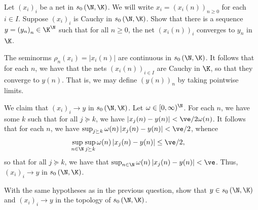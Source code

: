 \documentclass[10pt]{mypackage}
\begin{document}
\begin{problem}[Problem II.8]
  Let $\left( x_i \right)_i$ be a net in $s_0\left( \N,\K \right)$. We will write $x_i = \left( x_{i}(n) \right)_{n\geq 0}$ for each $i\in I$. Suppose $\left( x_i \right)_i$ is Cauchy in $s_0\left( \N,\K \right)$. Show that there is a sequence $y = \left( y_n \right)_n\in \K^{\N}$ such that for all $n\geq 0$, the net $\left( x_i(n) \right)_{i}$ converges to $y_n$ in $\K$.
\end{problem}
\begin{solution}
  The seminorms $\rho_{n}\left(x_i\right) = \left\vert x_i(n) \right\vert$ are continuous in $s_0\left( \N,\K \right)$. It follows that for each $n$, we have that the nets $\left( x_i(n) \right)_{i\in I}$ are Cauchy in $\K$, so that they converge to $y(n)$. That is, we may define $\left( y(n) \right)_n$ by taking pointwise limits.

  We claim that $\left( x_i \right)_{i}\rightarrow y$ in $s_0\left( \N,\K \right)$. Let $\omega\in [0,\infty)^{\N}$. For each $n$, we have some $k$ such that for all $j\succeq k$, we have $\left\vert x_j(n)-y(n) \right\vert < \ve/2\omega(n)$. It follows that for each $n$, we have $\sup_{j\succeq k}\omega(n)\left\vert x_j(n) -y(n)\right\vert < \ve/2$, whence
  \begin{align*}
    \sup_{n\in \N} \sup_{j\succeq k} \omega(n) \left\vert x_j(n)-y(n) \right\vert &\leq \ve/2,
  \end{align*}
  so that for all $j\succeq k$, we have that $\sup_{n\in \N}\omega(n)\left\vert x_j(n)-y(n) \right\vert < \ve$. Thus, $\left( x_i \right)_i\rightarrow y$ in $s_0\left( \N,\K \right)$.
\end{solution}
\begin{problem}[Problem II.9]
  With the same hypotheses as in the previous question, show that $y\in s_0\left( \N,\K \right)$ and $\left( x_i \right)_i\rightarrow y$ in the topology of $s_0\left( \N,\K \right)$.
\end{problem}
\end{document}
